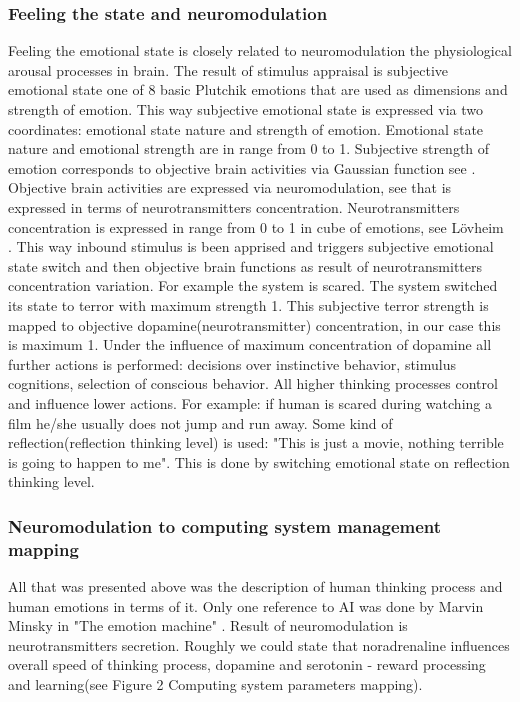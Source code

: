 \subsubsection{Feeling the state and neuromodulation}

Feeling the emotional state is closely related to neuromodulation the physiological arousal processes in brain. The result of stimulus appraisal is subjective emotional state one of 8 basic Plutchik emotions that are used as dimensions and strength of emotion. This way subjective emotional state is expressed via two coordinates: emotional state nature and strength of emotion. Emotional state nature and emotional strength are in range from 0 to 1. Subjective strength of emotion corresponds to objective brain activities via Gaussian function see \cite{hourglass}. Objective brain activities are expressed via neuromodulation, see \cite{emotionsbraintorobot} that is expressed in terms of neurotransmitters concentration. Neurotransmitters  concentration is expressed in range from 0 to 1 in cube of emotions, see L\"{o}vheim \cite{cubeofemotions}. This way inbound stimulus is been apprised and triggers subjective emotional state switch and then objective brain functions as result of neurotransmitters concentration variation. For example the system is scared. The system switched its state to terror with maximum strength 1. This subjective terror strength is mapped to objective dopamine(neurotransmitter) concentration, in our case this is maximum 1. Under the influence of maximum concentration of dopamine all further actions is performed: decisions over instinctive behavior, stimulus cognitions, selection of conscious behavior. All higher thinking processes control and influence lower actions. For example: if human is scared during watching a film he/she usually does not jump and run away. Some kind of reflection(reflection thinking level) is used: "This is just a movie, nothing terrible is going to happen to me". This is done by switching emotional state on reflection thinking level.

\subsubsection{Neuromodulation to computing system management mapping}

All that was presented above was the description of human thinking process and human emotions in terms of it. Only one reference to AI was done by Marvin Minsky in "The emotion machine" \cite{emotionmachine}. Result of neuromodulation is neurotransmitters secretion. Roughly we could state that noradrenaline influences overall speed of thinking process, dopamine and serotonin - reward processing and learning(see Figure 2 Computing system parameters mapping).


